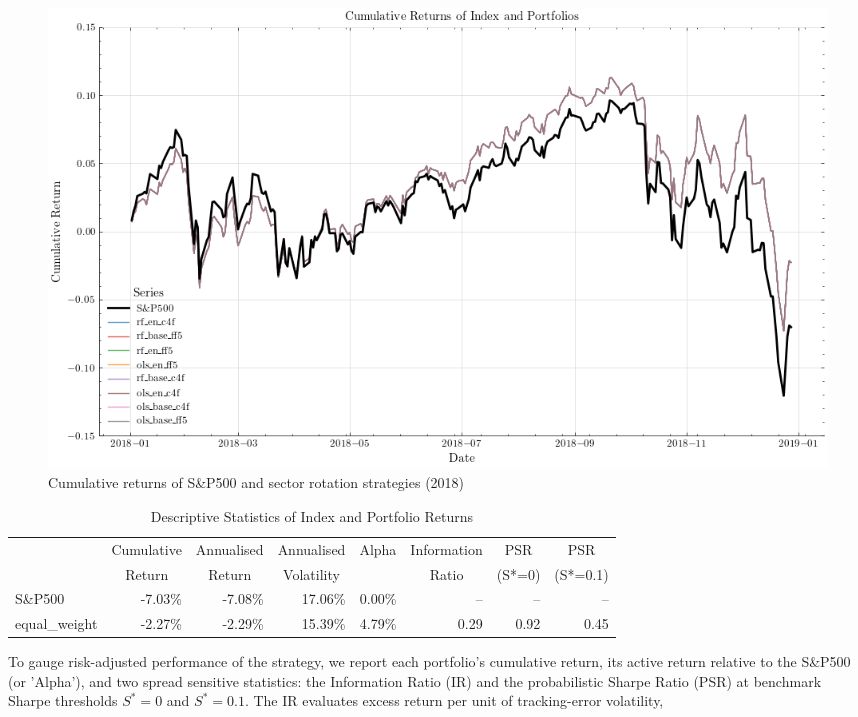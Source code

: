 \begin{figure}[H]
    \centering
    \includegraphics[width=\textwidth]{plots/results/equal_w_cum_ret_plot.png}
    \caption{Cumulative returns of S\&P500 and sector rotation strategies (2018)}\label{fig:eq_w_cum_ret_plot}
\end{figure}


\begin{table}[ht]
\centering
\caption{Descriptive Statistics of Index and Portfolio Returns}
\label{tab:return_stats_1}
\begin{tabular}{lrrrrrrr}
\toprule
{} & \multicolumn{1}{c}{Cumulative} & \multicolumn{1}{c}{Annualised} & \multicolumn{1}{c}{Annualised} & \multicolumn{1}{c}{Alpha} & \multicolumn{1}{c}{Information} & \multicolumn{1}{c}{PSR} & \multicolumn{1}{c}{PSR} \\
{} & \multicolumn{1}{c}{Return} & \multicolumn{1}{c}{Return} & \multicolumn{1}{c}{Volatility} & {} & \multicolumn{1}{c}{Ratio} & \multicolumn{1}{c}{(S*=0)} & \multicolumn{1}{c}{(S*=0.1)} \\
\midrule
S\&P500 & -7.03\% & -7.08\% & 17.06\% & 0.00\% & -- & -- & -- \\
equal\_weight & -2.27\% & -2.29\% & 15.39\% & 4.79\% & 0.29 & 0.92 & 0.45 \\
\bottomrule
\end{tabular}
\end{table}


To gauge risk-adjusted performance of the strategy, we report each portfolio's cumulative return, its active return relative to the S\&P500 (or 'Alpha'), and two spread sensitive statistics: the Information Ratio (IR) and the probabilistic Sharpe Ratio (PSR) at benchmark Sharpe thresholds $S^{*}=0$ and $S^{*}=0.1$. The IR evaluates excess return per unit of tracking-error volatility,

